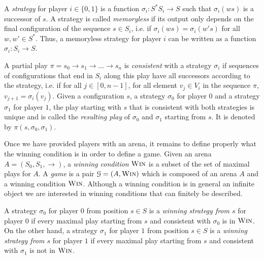 \documentclass[a4paper,UKenglish,cleveref, autoref, thm-restate]{lipics-v2021}
\newcommand{\win}{\textsc{Win}}
\begin{document}


A {\em strategy} for player $i \in \{ 0,1\}$ is a function $\sigma_i : S^* S_i \to S$ such
that $\sigma_i(ws)$ is a successor of $s$.
%
A strategy is called {\em memoryless} if its output only depends on the final configuration of the sequence $s \in S_i$, i.e. if $\sigma_i(ws) = \sigma_i(w's)$ for all $w,w' \in S^*$. Thus, a memoryless strategy for player $i$ can be written  as a function $\sigma_i: S_i \to S$.

A partial play $\pi = s_0 \rightarrow s_1 \rightarrow \ldots \rightarrow s_n$ is {\em consistent} with a strategy $\sigma_i$ if sequences of configurations that end in $S_i$ along this play have all successors according to the strategy, i.e.
if for all $j\in[0,n-1]$, for all element $v_j \in V_i$ in the sequence $\pi$,
$v_{j+1} = \sigma_i(v_j)$.
 Given a configuration $s$,   a strategy $\sigma_0$ for player $0$ and a strategy $\sigma_1$ for player $1$, the play starting with $s$ that is consistent with both strategies is unique and is called the {\em resulting play} of $\sigma_0$ and $\sigma_1$ starting from $s$. It is 
denoted by $\pi(s, \sigma_0, \sigma_1)$.


Once we have provided players with an arena, it remains to define  properly what the winning condition is in order to define a game. Given an arena $A = (S_0, S_1, \rightarrow)$, a {\em winning condition}
$\win$
is a subset  
of the set of maximal plays for $A$. A {\em game} is a pair $\mathcal{G}= (A, \win)$ which is composed of an arena $A$ and a winning condition $\win$.
Although a winning condition is in general an infinite object we are interested in winning conditions 
that can finitely be described.





A strategy $\sigma_0$ for player $0$ from position $s \in S$ is a {\em winning strategy
 from $s$} for player $0$ if 
every maximal play starting from $s$ and consistent with $\sigma_0$ is in $\win$.
On the other hand, a strategy $\sigma_1$ for player $1$ from position $s \in S$ is a {\em winning strategy
 from $s$} for player $1$ if 
every maximal play starting from $s$ and consistent with $\sigma_1$ is not in $\win$.
 
\end{document}
